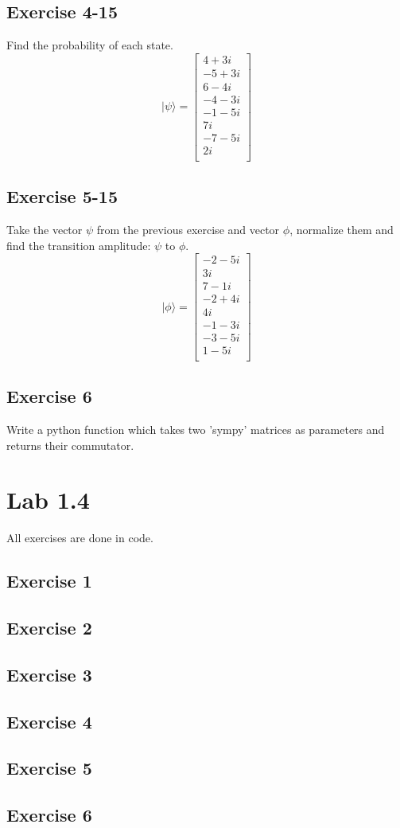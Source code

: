 \documentclass{article}
\begin{document}
        \subsection*{Exercise 4-15}
            Find the probability of each state.
            \[
                 |\psi \rangle =\left[\begin{matrix}4+3i\\-5+3i\\6-4i\\-4-3i\\-1-5i\\7i\\-7-5i\\2i\\\end{matrix}\right]
            \]
        \subsection*{Exercise 5-15}
            Take the vector $\psi$ from the previous exercise and vector $\phi$, normalize them and find the transition amplitude: $\psi$ to $\phi$.
            \[
                |\phi \rangle =\left[\begin{matrix}-2-5i\\3i\\7-1i\\-2+4i\\4i\\-1-3i\\-3-5i\\1-5i\\\end{matrix}\right]
            \]
        \subsection*{Exercise 6}
            Write a python function which takes two 'sympy' matrices as parameters and returns their commutator.


    \section*{Lab 1.4}
        All exercises are done in code.
        \subsection*{Exercise 1}
        \subsection*{Exercise 2}
        \subsection*{Exercise 3}
        \subsection*{Exercise 4}
        \subsection*{Exercise 5}
        \subsection*{Exercise 6}

        
\end{document}
